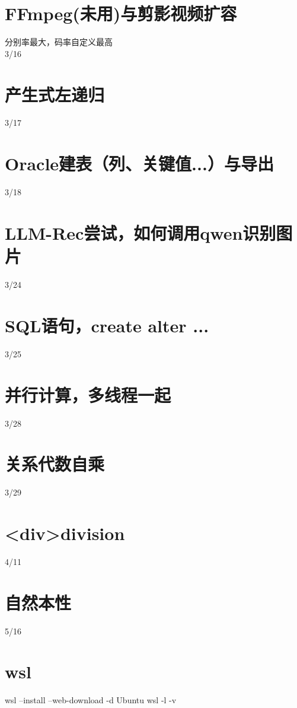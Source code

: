 \documentclass{ctexart}
\newcommand{\secn}[1]{
	\section*{\centering\normalfont #1}
}
\begin{document}
\section*{\normalfont FFmpeg(未用)与剪影视频扩容}

分别率最大，码率自定义最高\\

3/16

\secn{产生式左递归}

3/17

\secn{Oracle建表（列、关键值...）与导出}

3/18

\secn{LLM-Rec尝试，如何调用qwen识别图片}

3/24
\secn{SQL语句，create alter ...}

3/25
\secn{并行计算，多线程一起}

3/28
\secn{关系代数自乘}

3/29
\secn{<div>division}

4/11
\secn{自然本性}

5/16
\secn{wsl}
wsl --install --web-download -d Ubuntu
wsl -l -v
\end{document}
